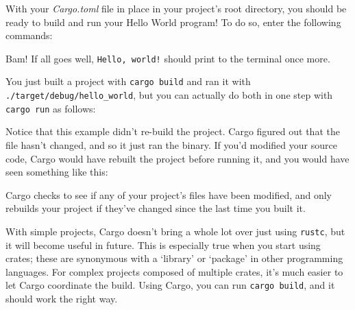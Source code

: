 \documentclass[a4paper,]{book}
\newenvironment{Shaded}{\begin{snugshade}}{\end{snugshade}}
\newcommand{\KeywordTok}[1]{\textcolor[rgb]{0.13,0.29,0.53}{\textbf{{#1}}}}
\newcommand{\NormalTok}[1]{{#1}}
\begin{document}
With your \emph{Cargo.toml} file in place in your project's root
directory, you should be ready to build and run your Hello World
program! To do so, enter the following commands:

\begin{Shaded}
\end{Shaded}

Bam! If all goes well, \texttt{Hello,\ world!} should print to the
terminal once more.

You just built a project with \texttt{cargo\ build} and ran it with
\texttt{./target/debug/hello\_world}, but you can actually do both in
one step with \texttt{cargo\ run} as follows:

\begin{Shaded}
\end{Shaded}

Notice that this example didn't re-build the project. Cargo figured out
that the file hasn't changed, and so it just ran the binary. If you'd
modified your source code, Cargo would have rebuilt the project before
running it, and you would have seen something like this:

\begin{Shaded}
\end{Shaded}

Cargo checks to see if any of your project's files have been modified,
and only rebuilds your project if they've changed since the last time
you built it.

With simple projects, Cargo doesn't bring a whole lot over just using
\texttt{rustc}, but it will become useful in future. This is especially
true when you start using crates; these are synonymous with a `library'
or `package' in other programming languages. For complex projects
composed of multiple crates, it's much easier to let Cargo coordinate
the build. Using Cargo, you can run \texttt{cargo\ build}, and it should
work the right way.
\end{document}
